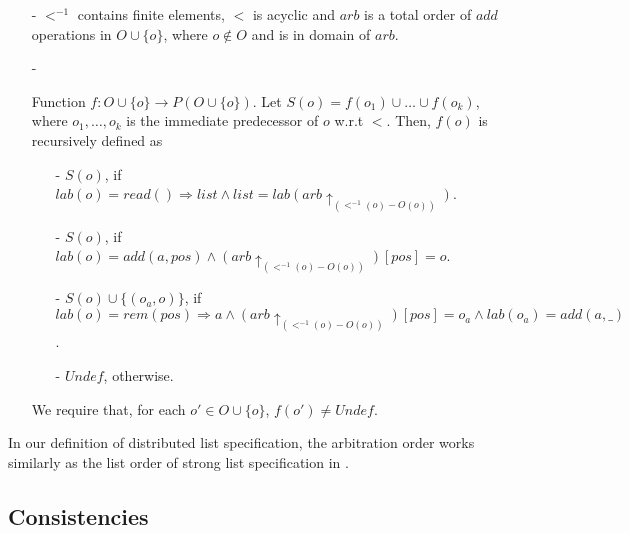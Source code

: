 \begin{itemize}
\setlength{\itemsep}{0.5pt}
\item[-] $<^{-1}$ contains finite elements, $<$ is acyclic and $arb$ is a total order of $add$ operations in $O \cup \{ o \}$, where $o \notin O$ and is in domain of $arb$.

\item[-] {\color {red}Function $f: O \cup \{ o \} \rightarrow P(O \cup \{ o \})$. Let $S(o) = f(o_1) \cup \ldots \cup f(o_k)$, where $o_1,\ldots,o_k$ is the immediate predecessor of $o$ w.r.t $<$. Then, $f(o)$ is recursively defined as

    \begin{itemize}
    \setlength{\itemsep}{0.5pt}
    \item[-] $S(o)$, if $lab(o)=read()\Rightarrow list \wedge list = lab( arb \uparrow_{ (<^{-1}(o)-O(o)) } )$.

    \item[-] $S(o)$, if $lab(o)=add(a,pos) \wedge ( arb \uparrow_{ (<^{-1}(o)-O(o)) } )[pos]=o$.

    \item[-] $S(o) \cup \{ (o_a,o) \}$, if $lab(o)=rem(pos)\Rightarrow a \wedge ( arb \uparrow_{ (<^{-1}(o)-O(o)) } )[pos]=o_a \wedge lab(o_a)=add(a,\_)$.

    \item[-] $\mathit{Undef}$, otherwise.
    \end{itemize}

    We require that, for each $o' \in O \cup \{ o \}$, $f(o') \neq \mathit{Undef}$.}
\end{itemize}


In our definition of distributed list specification, the arbitration order works similarly as the list order of strong list specification in \cite{Attiya:2016}.





\subsection{Consistencies}
\label{subsec:consistencies}


